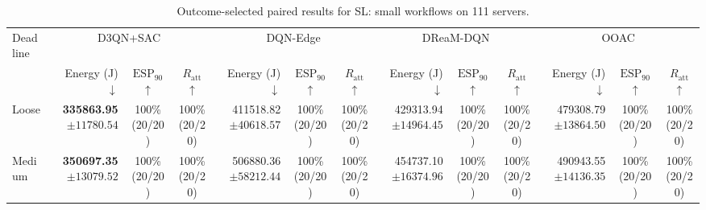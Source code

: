 \begin{table}[!t]
\centering
\caption{Outcome-selected paired results for SL: small workflows on 111 servers.}
\label{tab:conditional_case_sl}
\begingroup
\footnotesize
\setlength{\tabcolsep}{2.2pt}
\renewcommand{\arraystretch}{1.08}
\begin{tabular}{@{}l*{4}{rcc}@{}}
\toprule
Deadline & \multicolumn{3}{c}{D3QN+SAC} & \multicolumn{3}{c}{DQN-Edge} & \multicolumn{3}{c}{DReaM-DQN} & \multicolumn{3}{c}{OOAC} \\
\cmidrule(lr){2-4}\cmidrule(lr){5-7}\cmidrule(lr){8-10}\cmidrule(lr){11-13}
 & Energy (J) $\downarrow$ & $\mathrm{ESP}_{90}$ $\uparrow$ & $R_{\mathrm{att}}$ $\uparrow$ & Energy (J) $\downarrow$ & $\mathrm{ESP}_{90}$ $\uparrow$ & $R_{\mathrm{att}}$ $\uparrow$ & Energy (J) $\downarrow$ & $\mathrm{ESP}_{90}$ $\uparrow$ & $R_{\mathrm{att}}$ $\uparrow$ & Energy (J) $\downarrow$ & $\mathrm{ESP}_{90}$ $\uparrow$ & $R_{\mathrm{att}}$ $\uparrow$ \\
\midrule
Loose & \shortstack[r]{\textbf{335863.95}\\$\pm 11780.54$} & \shortstack[c]{100\%\\(20/20)} & \shortstack[c]{100\%\\(20/20)} & \shortstack[r]{411518.82\\$\pm 40618.57$} & \shortstack[c]{100\%\\(20/20)} & \shortstack[c]{100\%\\(20/20)} & \shortstack[r]{429313.94\\$\pm 14964.45$} & \shortstack[c]{100\%\\(20/20)} & \shortstack[c]{100\%\\(20/20)} & \shortstack[r]{479308.79\\$\pm 13864.50$} & \shortstack[c]{100\%\\(20/20)} & \shortstack[c]{100\%\\(20/20)} \\
Medium & \shortstack[r]{\textbf{350697.35}\\$\pm 13079.52$} & \shortstack[c]{100\%\\(20/20)} & \shortstack[c]{100\%\\(20/20)} & \shortstack[r]{506880.36\\$\pm 58212.44$} & \shortstack[c]{100\%\\(20/20)} & \shortstack[c]{100\%\\(20/20)} & \shortstack[r]{454737.10\\$\pm 16374.96$} & \shortstack[c]{100\%\\(20/20)} & \shortstack[c]{100\%\\(20/20)} & \shortstack[r]{490943.55\\$\pm 14136.35$} & \shortstack[c]{100\%\\(20/20)} & \shortstack[c]{100\%\\(20/20)} \\

\end{tabular}
\end{table}
